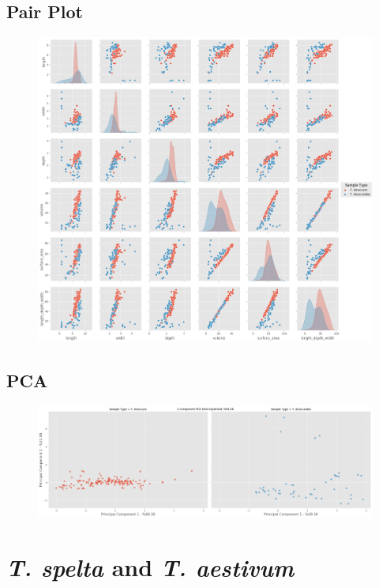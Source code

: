 \documentclass[11pt]{report}
\begin{document}
\subsection{Pair Plot}
\label{sec:org2f74bf1}

\begin{figure}[htbp]
\centering
\includegraphics[width=18cm]{./images/results/group2/pairplot.png}
\label{fig:orgce0fb83}
\end{figure}

\clearpage
\subsection{PCA}
\label{sec:org94e4cd1}
\begin{figure}[htbp]
\centering
\includegraphics[width=18cm]{./images/results/group2/pca.png}
\label{fig:org926b01b}
\end{figure}



\clearpage
\section{\emph{T. spelta} and \emph{T. aestivum}}
\label{sec:org0fbd08e}
\end{document}
